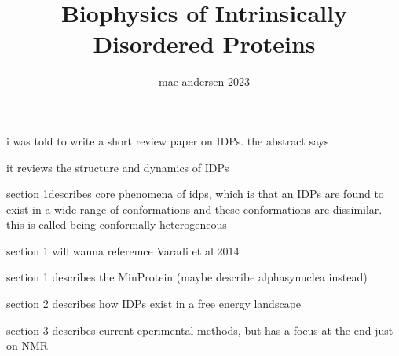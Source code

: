 \documentclass{article}
\title{Biophysics of Intrinsically Disordered Proteins}
\subtitle{mae andersen 2023}
\begin{document}
i was told to write a short review paper on IDPs.
the abstract says
\begin{items}
    \item it reviews the structure and dynamics of IDPs
    \item section 1describes core phenomena of idps, which is that an IDPs are found to exist in a wide range of conformations and these conformations are dissimilar. this is called being conformally heterogeneous
    \item section 1 will wanna referemce Varadi et al 2014
    \item section 1 describes the MinProtein (maybe describe alphasynuclea instead)
    \item section 2 describes how IDPs exist in a free energy landscape
    \item section 3 describes current eperimental methods, but has a focus at the end just on NMR
\end{items}
\end{document}
